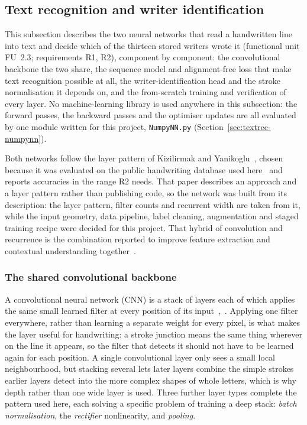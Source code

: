 \subsection{Text recognition and writer identification}
\label{sec:textrec}
\label{sec:writerid}

This subsection describes the two neural networks that read a handwritten line into text and decide which of the thirteen stored writers wrote it (functional unit FU~2.3; requirements R1, R2), component by component: the convolutional backbone the two share, the sequence model and alignment-free loss that make text recognition possible at all, the writer-identification head and the stroke normalisation it depends on, and the from-scratch training and verification of every layer. No machine-learning library is used anywhere in this subsection: the forward passes, the backward passes and the optimiser updates are all evaluated by one module written for this project, \texttt{NumpyNN.py} (Section~\ref{sec:textrec-numpynn}).

Both networks follow the layer pattern of Kizilirmak and Yanikoglu~\cite[p.~9]{kizilirmak2023}, chosen because it was evaluated on the public handwriting database used here~\cite{marti2002} and reports accuracies in the range R2 needs. That paper describes an approach and a layer pattern rather than publishing code, so the network was built from its description: the layer pattern, filter counts and recurrent width are taken from it, while the input geometry, data pipeline, label cleaning, augmentation and staged training recipe were decided for this project. That hybrid of convolution and recurrence is the combination reported to improve feature extraction and contextual understanding together~\cite{kumar2024,ma2023}.

\subsubsection{The shared convolutional backbone}
\label{sec:rec-backbone}

A convolutional neural network (CNN) is a stack of layers each of which applies the same small learned filter at every position of its input~\cite[Sec.~II-A]{lecun1998},~\cite{yahya2021}. Applying one filter everywhere, rather than learning a separate weight for every pixel, is what makes the layer useful for handwriting: a stroke junction means the same thing wherever on the line it appears, so the filter that detects it should not have to be learned again for each position. A single convolutional layer only sees a small local neighbourhood, but stacking several lets later layers combine the simple strokes earlier layers detect into the more complex shapes of whole letters, which is why depth rather than one wide layer is used. Three further layer types complete the pattern used here, each solving a specific problem of training a deep stack: \emph{batch normalisation}, the \emph{rectifier} nonlinearity, and \emph{pooling}.


